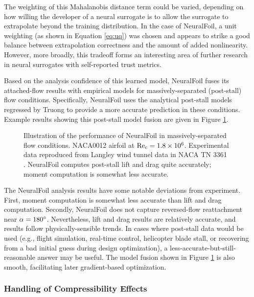 \documentclass[journal]{new-aiaa}
\begin{document}
The weighting of this Mahalanobis distance term could be varied, depending on how willing the developer of a neural surrogate is to allow the surrogate to extrapolate beyond the training distribution. In the case of NeuralFoil, a unit weighting (as shown in Equation \ref{eq:uq}) was chosen and appears to strike a good balance between extrapolation correctness and the amount of added nonlinearity. However, more broadly, this tradeoff forms an interesting area of further research in neural surrogates with self-reported trust metrics.

Based on the analysis confidence of this learned model, NeuralFoil fuses its attached-flow results with empirical models for massively-separated (post-stall) flow conditions. Specifically, NeuralFoil uses the analytical post-stall models regressed by Truong \cite{truongAnalyticalModelAirfoil2020} to provide a more accurate prediction in these conditions. Example results showing this post-stall model fusion are given in Figure \ref{fig:post_stall_extrapolation}.

\begin{figure}[H]
    \centering
    
    \caption{Illustration of the performance of NeuralFoil in massively-separated flow conditions. NACA0012 airfoil at $\rm Re_c=1.8\times 10^6$. Experimental data reproduced from Langley wind tunnel data in NACA TN 3361 \cite{critzosAerodynamicCharacteristicsNACA1955}. NeuralFoil computes post-stall lift and drag quite accurately; moment computation is somewhat less accurate.}
    \label{fig:post_stall_extrapolation}
\end{figure}

The NeuralFoil analysis results have some notable deviations from experiment. First, moment computation is somewhat less accurate than lift and drag computation. Secondly, NeuralFoil does not capture reversed-flow reattachment near $\alpha=180\degree$. Nevertheless, lift and drag results are relatively accurate, and results follow physically-sensible trends. In cases where post-stall data would be used (e.g., flight simulation, real-time control, helicopter blade stall, or recovering from a bad initial guess during design optimization), a less-accurate-but-still-reasonable answer may be useful. The model fusion shown in Figure \ref{fig:post_stall_extrapolation} is also smooth, facilitating later gradient-based optimization.

\subsubsection{Handling of Compressibility Effects}
\label{sec:compressibility}
\end{document}
